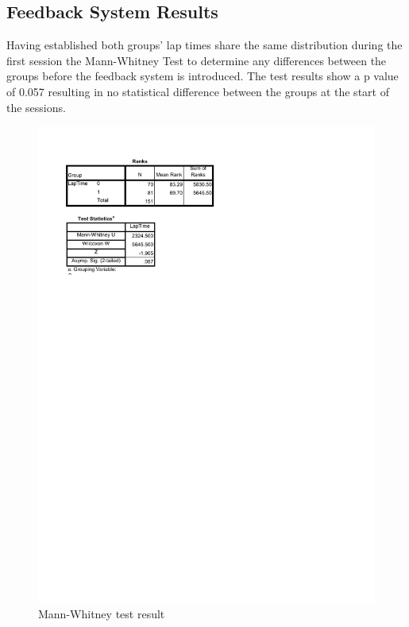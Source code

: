 \subsection{Feedback System Results}
\label{sec:eval-feedbackSysResults}

Having established both groups' lap times share the same distribution during the first session the Mann-Whitney Test to determine any differences between the groups before the feedback system is introduced. The test results show a p value of 0.057 resulting in no statistical difference between the groups at the start of the sessions.

\begin{figure}[!htb]
	\centering
	\includegraphics[width=\textwidth]{charts/Mann-Whitney.pdf}
	\caption[Mann-Whitney]{Mann-Whitney test result}
	\label{fig:chart-KolmogorowSmimov}
\end{figure}

